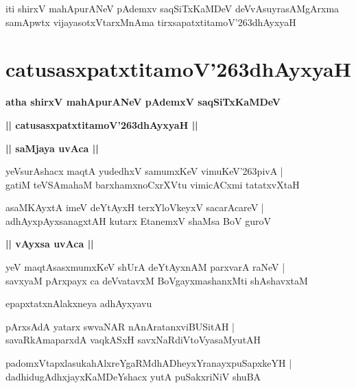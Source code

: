 \documentclass[twoside,12pt,openright]{book}
\def\S{\char'263}
\newcounter{shloka}[chapter]
\def\uvaca#1{\centerline{{\large\textbf{#1}}}}
\begin{document}
\begin{center}
iti shirxV mahApurANeV pAdemxv saqSiTxKaMDeV deVvAsuyrasAMgArxma samApwtx vijayasotxVtarxMnAma 
tirxsapatxtitamoV\S dhAyxyaH 
\end{center}

\chapter{catusasxpatxtitamoV\S dhAyxyaH}

\begin{center}
{\LARGE\bfseries atha shirxV mahApurANeV pAdemxV saqSiTxKaMDeV}
\end{center}

\begin{center}
{\LARGE\bfseries || catusasxpatxtitamoV\S dhAyxyaH || }
\end{center}

\uvaca{|| saMjaya uvAca ||}

\begin{shloka}%
yeVsurAshacx maqtA yudedhxV samumxKeV vimuKeV\S pivA |\\
gatiM teVSAmahaM barxhamxnoCxrXVtu vimicACxmi tatatxvXtaH 
\end{shloka}

\begin{shloka}%
asaMKAyxtA imeV deYtAyxH terxYloVkeyxV sacarAcareV |\\
adhAyxpAyxsanagxtAH kutarx EtanemxV shaMsa BoV guroV 
\end{shloka}

\uvaca{|| vAyxsa uvAca ||}

\begin{shloka}%
yeV maqtAsasxmumxKeV shUrA deYtAyxnAM parxvarA raNeV |\\
savxyaM pArxpayx ca deVvatavxM BoVgayxmashanxMti shAshavxtaM 
\end{shloka}

\begin{center}
epapxtatxnAlakxneya adhAyxyavu
\end{center}

\begin{shloka}%
pArxsAdA yatarx swvaNAR nAnAratanxviBUSitAH |\\
savaRkAmaparxdA vaqkASxH savxNaRdiVtoVyasaMyutAH 
\end{shloka}

\begin{shloka}%
padomxVtapxlasukahAlxreYgaRMdhADheyxYranayxpuSapxkeYH |\\
dadhidugAdhxjayxKaMDeYshacx yutA puSakxriNiV shuBA
\end{shloka}
\end{document}
